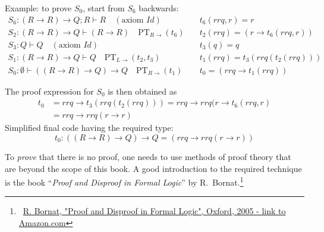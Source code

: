 Example: to prove $S_{0}$, start from $S_{6}$ backwards:{\footnotesize{}
\begin{align*}
S_{6}:\left(R\rightarrow R\right)\rightarrow Q;R\vdash R\quad(\text{axiom }Id)\quad & t_{6}(rrq,r)=r\\
S_{2}:\left(R\rightarrow R\right)\rightarrow Q\vdash\left(R\rightarrow R\right)\quad\text{PT}_{R\rightarrow}(t_{6})\quad & t_{2}(rrq)=\left(r\rightarrow t_{6}(rrq,r)\right)\\
S_{3}:Q\vdash Q\quad(\text{axiom }Id)\quad & t_{3}(q)=q\\
S_{1}:\left(R\rightarrow R\right)\rightarrow Q\vdash Q\quad\text{PT}_{L\rightarrow}(t_{2},t_{3})\quad & t_{1}(rrq)=t_{3}(rrq(t_{2}(rrq)))\\
S_{0}:\emptyset\vdash\left(\left(R\rightarrow R\right)\rightarrow Q\right)\rightarrow Q\quad\text{PT}_{R\rightarrow}(t_{1})\quad & t_{0}=\left(rrq\rightarrow t_{1}(rrq)\right)
\end{align*}
}{\footnotesize\par}

The proof expression for $S_{0}$ is then obtained as
\begin{align*}
t_{0} & =rrq\rightarrow t_{3}\left(rrq\left(t_{2}\left(rrq\right)\right)\right)=rrq\rightarrow rrq(r\rightarrow t_{6}\left(rrq,r\right)\\
 & =rrq\rightarrow rrq\left(r\rightarrow r\right)
\end{align*}
Simplified final code having the required type: 
\[
t_{0}:\left(\left(R\rightarrow R\right)\rightarrow Q\right)\rightarrow Q=\left(rrq\rightarrow rrq\left(r\rightarrow r\right)\right)
\]

To \emph{prove} that there is no proof, one needs to use methods of
proof theory that are beyond the scope of this book. A good introduction
to the required technique is the book \textsf{``}\emph{Proof and Disproof
in Formal Logic}\textsf{''} by R.~Bornat.\footnote{~\href{https://www.amazon.com/Proof-Disproof-Formal-Logic-Introduction/dp/0198530277}{R. Bornat, "Proof and Disproof in Formal Logic", Oxford, 2005 - link to Amazon.com}} 

